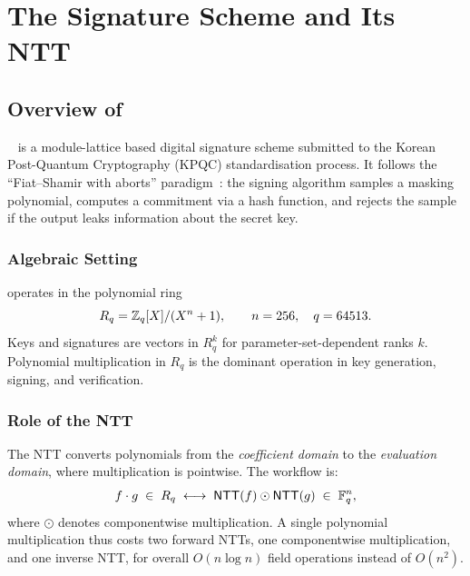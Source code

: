 
\chapter{The \haetae{} Signature Scheme and Its NTT}
\label{ch:haetae_ntt}

\section{Overview of \haetae{}}

\haetae{}~\cite{HAETAE2022} is a module-lattice based digital signature scheme
submitted to the Korean Post-Quantum Cryptography (KPQC) standardisation
process.  It follows the ``Fiat--Shamir with aborts'' paradigm~\cite{Lyubashevsky2012}:
the signing algorithm samples a masking polynomial, computes a commitment via a
hash function, and rejects the sample if the output leaks information about the
secret key.

\subsection{Algebraic Setting}

\haetae{} operates in the polynomial ring
\begin{equation}
  R_q = \mathbb{Z}_q[X]/(X^n + 1), \qquad n = 256,\quad q = 64513.
\label{eq:ring}
\end{equation}
Keys and signatures are vectors in $R_q^k$ for parameter-set-dependent
ranks $k$.  Polynomial multiplication in $R_q$ is the dominant operation in
key generation, signing, and verification.

\subsection{Role of the NTT}

The NTT converts polynomials from the \emph{coefficient domain} to the
\emph{evaluation domain}, where multiplication is pointwise.  The workflow is:
\begin{equation}
  f \cdot g \;\in\; R_q
  \;\longleftrightarrow\;
  \mathsf{NTT}(f) \odot \mathsf{NTT}(g) \;\in\; \mathbb{F}_q^n,
\label{eq:ntt_mul}
\end{equation}
where $\odot$ denotes componentwise multiplication.  A single polynomial
multiplication thus costs two forward NTTs, one componentwise multiplication,
and one inverse NTT, for overall $O(n \log n)$ field operations instead of
$O(n^2)$.


